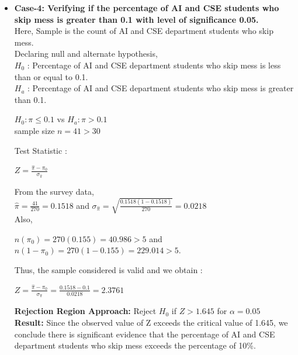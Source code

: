 \documentclass{article}
\begin{document}
\begin{itemize}
\item{\textbf{Case-4: Verifying if the percentage of AI and CSE students who skip mess is greater than 0.1 with level of significance 0.05.}}\\
Here, Sample is the count of AI and CSE department students who skip mess.\\
Declaring null and alternate hypothesis,\\
$H_0$ : Percentage of AI and CSE department students who skip mess is less than or equal to 0.1.\\
$H_a$ : Percentage of AI and CSE department students who skip mess is greater than 0.1.
\begin{center}
$H_0 : \pi \leq 0.1$ vs $H_a : \pi > 0.1$\\
sample size $n = 41 > 30$
\end{center}
Test Statistic :
\begin{center}
$Z = \frac{\hat{\pi}-{\pi_0}}{\sigma_{\hat{\pi}}}$
\end{center}
From the survey data,\\
$\hat{\pi} = \frac{41}{270} = 0.1518$ and $\sigma_{\hat{\pi}} = \sqrt{\frac{0.1518(1-0.1518)}{270}} = 0.0218$\\
Also, 
\begin{center}
$n(\pi_0) = 270(0.155) = 40.986 > 5$ and $n(1-\pi_0) = 270(1-0.155) = 229.014 > 5.$
\end{center}
Thus, the sample considered is valid and we obtain :
\begin{center}
$Z = \frac{\hat{\pi}-{\pi_0}}{\sigma_{\hat{\pi}}} = \frac{0.1518-0.1}{0.0218} = 2.3761$
\end{center}
\textbf{Rejection Region Approach:}
Reject $H_0$ if $Z>1.645$ for $\alpha = 0.05$\\
\textbf{Result:}
Since the observed value of Z exceeds the critical value of
1.645, we conclude there is significant evidence that the
percentage of AI and CSE department students who skip mess exceeds the percentage of 10\%.
\end{itemize}
\end{document}
